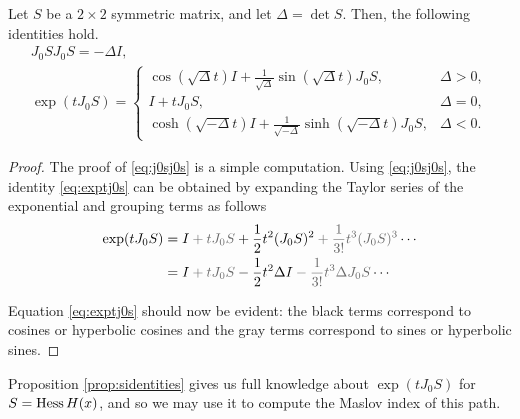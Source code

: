 \begin{prop}\label{prop:sidentities}
Let $S$ be a $2 \times 2$ symmetric matrix, and let $\Delta = \det S$. Then, the following identities hold.
\begin{gather}
J_0 S J_0 S = - \Delta I, \label{eq:j0sj0s}\\
\exp(t J_0 S) = \begin{cases}
\cos(\sqrt{\Delta} t) I + \frac1{\sqrt{\Delta}} \sin(\sqrt{\Delta} t) J_0 S, & \Delta > 0,\\
I + t J_0 S, & \Delta = 0,\\
\cosh(\sqrt{-\Delta} t) I + \frac1{\sqrt{-\Delta}} \sinh(\sqrt{-\Delta} t) J_0 S, & \Delta < 0.
\end{cases} \label{eq:exptj0s}
\end{gather}
\end{prop}

\begin{proof}
The proof of \eqref{eq:j0sj0s} is a simple computation. Using \eqref{eq:j0sj0s}, the identity \eqref{eq:exptj0s} can be obtained by expanding the Taylor series of the exponential and grouping terms as follows
\begin{equation}
\begin{aligned}
\exp(t J_0 S) &= 
I \color{black!60} + t J_0 S \color{black} + \frac12 t^2 (J_0 S)^2 \color{black!60} +\frac1{3!} t^3 (J_0 S)^3 \color{black} \cdots \\
&= 
I \color{black!60} + t J_0 S \color{black} - \frac12 t^2 \Delta I \color{black!60} -\frac1{3!} t^3 \Delta J_0 S \color{black} \cdots
\end{aligned}
\end{equation}

Equation \eqref{eq:exptj0s} should now be evident: the black terms correspond to cosines or hyperbolic cosines and the gray terms correspond to sines or hyperbolic sines.
\end{proof}

Proposition \ref{prop:sidentities} gives us full knowledge about $\exp(t J_0 S)$ for $S = \operatorname{Hess} H(x)$, and so we may use it to compute the Maslov index of this path.

